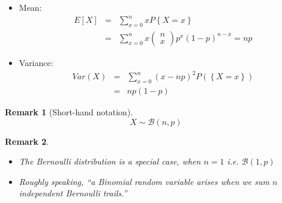 \documentclass[smaller]{beamer}\usepackage[]{graphicx}\usepackage[]{color}
\newtheorem{remark}{Remark}[section]
\renewcommand{\Pr}{P}
\newenvironment{stepitemize}{\begin{itemize}[<+->]}{\end{itemize} }
\begin{document}
\begin{frame}{\secname}
  \begin{stepitemize}
  \item Mean:
  \begin{eqnarray*}
  E\left[ X\right] &=&\sum_{x=0}^{n}x\Pr \left\{ X=x\right\} \\
  &=&\sum_{x=0}^{n}x\left(
  \begin{array}{c}
  n \\
  x%
  \end{array}%
  \right) p^{x}\left( 1-p\right) ^{n-x} = np
  \end{eqnarray*}

  \item Variance:%
  \begin{eqnarray*}
  Var\left( X\right) &=&\sum_{x=0}^{n}\left( x-np\right) ^{2} P (\left\{
  X=x\right\}) \\
  &=&np\left( 1-p\right)
  \end{eqnarray*}
  \end{stepitemize}

\end{frame}


\begin{frame}{\secname}

  \begin{remark}[Short-hand notation]
  $$X \sim \mathcal{B}(n,p)$$
  \end{remark}

  \begin{remark}
  \begin{itemize}
  \item The Bernoulli distribution is a special case, when $n=1$ i.e. $\mathcal{B}(1,p)$
  \medskip
  \item Roughly speaking, ``a Binomial random variable arises when we sum $n$ independent Bernoulli trails.''
  \end{itemize}
  \end{remark}
\end{frame}
\end{document}
